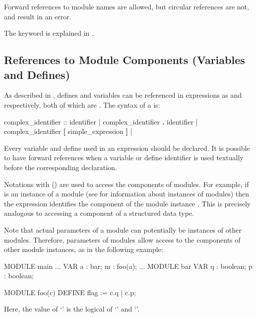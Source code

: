 \noindent Forward references to module names are allowed, but circular
references are not, and result in an error.

The keyword  is explained in .

\subsection{References to Module Components (Variables and Defines)}
\label{References to Module Components}

As described in , defines and variables
can be referenced in expressions as  and
 respectively, both of which are
. 
%
The syntax of a  is:\\

\begin{Grammar}
complex_identifier ::
        identifier
      | complex_identifier \textbf{.} identifier
      | complex_identifier \textbf{[} simple_expression \textbf{]}
      | 
\end{Grammar}

Every variable and define used in an expression should be declared. It
is possible to have forward references when a variable or define
identifier is used textually before the corresponding declaration.

Notations with  () are used to access the
components of modules.
%
For example, if  is an instance of a module (see  for information about instances of modules) then the
expression  identifies the component  of the module
instance . 
%
This is precisely analogous to accessing a component of a structured
data type.

Note that actual parameters of a module can potentially be instances
of other modules.
%
Therefore, parameters of modules allow access to the components of
other module instances, as in the following example:
%
\begin{nusmvCode}
MODULE main
...  VAR
  a : bar;
  m : foo(a);
...
MODULE bar
 VAR
   q : boolean;
   p : boolean;

MODULE foo(c)
 DEFINE
   flag := c.q | c.p;
\end{nusmvCode}
%
Here, the value of `' is the logical  of
`' and `'.


